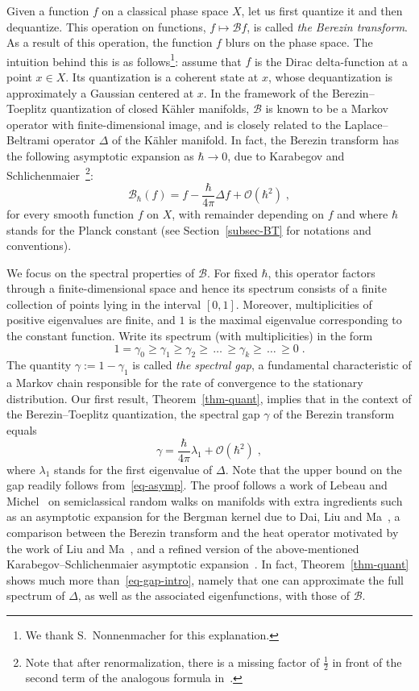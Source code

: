 \documentclass[11pt]{article}
\theoremstyle{definition}
\numberwithin{equation}{section}
\numberwithin{figure}{section}
\numberwithin{table}{section}
\newcommand{\cB}{{\mathcal{B}}}
\newcommand{\bigo}{\mathcal{O}}
\renewcommand\geq {\geqslant}
\newcommand\< {\mathcal{h}}
\renewcommand\> {\mathcal{i}}
\begin{document}
Given a function $f$ on a classical phase space $X$, let us first quantize it and then dequantize. This operation on functions, $f \mapsto \cB f$, is called \emph{the Berezin transform}. As a result of this operation, the function $f$ blurs on the phase space. The intuition behind this is as follows\footnote{We thank S.~Nonnenmacher for this explanation.}: assume that $f$ is the Dirac delta-function at a point $x \in X$. Its quantization is a coherent state at $x$, whose dequantization is approximately a Gaussian centered at $x$. In the framework of the Berezin--Toeplitz quantization of closed K\"ahler manifolds, $\cB$ is known to be a Markov operator with finite-dimensional image, and is closely related to the Laplace--Beltrami operator $\Delta$ of the K\"ahler manifold. In fact, the Berezin transform has the following asymptotic expansion as $\hbar\to 0$, due to Karabegov and Schlichenmaier~\cite{KS01}\footnote{Note that after renormalization, there is a missing factor of $\frac{1}{2}$ in front of the second term of the analogous formula in~\cite[(1.2)]{KS01}.}:
\begin{equation}\label{eq-asymp}
\cB_\hbar(f)= f-\frac{\hbar}{4\pi}\Delta f + \bigo(\hbar^2)\;,
\end{equation}
for every smooth function $f$ on $X$, with remainder depending on $f$ and where $\hbar$ stands for the Planck constant (see Section~\ref{subsec-BT} for notations and conventions).

We focus on the spectral properties of $\cB$. For fixed $\hbar$, this operator factors through a finite-dimensional space and hence its spectrum consists of a finite collection of points lying in the interval $[0,1]$. Moreover, multiplicities of positive eigenvalues are finite, and $1$ is the maximal eigenvalue corresponding to the constant function. Write its spectrum (with multiplicities) in the form
\[
1=\gamma_0
\geq \gamma_1 \geq \gamma_2\geq\,\dots\, \geq \gamma_k \geq\,\dots\,\geq 0\;.
\]
The quantity $\gamma:= 1-\gamma_1$ is called \emph{the spectral gap}, a fundamental characteristic of a Markov chain responsible for the rate of convergence to the stationary distribution. Our first result, Theorem~\ref{thm-quant}, implies that in the context of the Berezin--Toeplitz quantization, the spectral gap $\gamma$ of the Berezin transform equals
\begin{equation}\label{eq-gap-intro}
\gamma = \frac{\hbar}{4\pi}\lambda_1 + \bigo(\hbar^2)\;,
\end{equation}
where $\lambda_1$ stands for the first eigenvalue of $\Delta$. Note that the upper bound on the gap readily follows from~\eqref{eq-asymp}. The proof follows a work of Lebeau and Michel~\cite{LM} on semiclassical random walks on manifolds with extra ingredients such as an asymptotic expansion for the Bergman kernel due to Dai, Liu and Ma~\cite{DLM06}, a comparison between the Berezin transform and the heat operator motivated by the work of Liu and Ma~\cite{LM07}, and a refined version of the above-mentioned Karabegov--Schlichenmaier asymptotic expansion~\cite{KS01}. In fact, Theorem~\ref{thm-quant} shows much more than~\eqref{eq-gap-intro}, namely that one can approximate the full spectrum of $\Delta$, as well as the associated eigenfunctions, with those of $\cB$.
\end{document}
